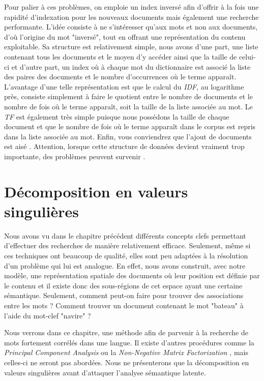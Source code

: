 Pour palier à ces problèmes, on emploie un index inversé afin d'offrir à la fois une rapidité d'indexation pour les nouveaux documents mais également une recherche performante. L'idée consiste à ne s'intéresser qu'aux mots et non aux documents, d'où l'origine du mot "inversé", tout en offrant une représentation du contenu exploitable. Sa structure est relativement simple, nous avons d'une part, une liste contenant tous les documents et le moyen d'y accéder ainsi que la taille de celui-ci et d'autre part, un index où à chaque mot du dictionnaire est associé la liste des paires des documents et le nombre d'occurrences où le terme apparaît. L'avantage d'une telle représentation est que le calcul du \textit{IDF}, au logarithme près, consiste simplement à faire le quotient entre le nombre de documents et le nombre de fois où le terme apparaît, soit la taille de la liste associée au mot. Le \textit{TF} est également très simple puisque nous possédons la taille de chaque document et que le nombre de fois où le terme apparaît dans le corpus est repris dans la liste associée au mot. Enfin, vous conviendrez que l'ajout de documents est aisé \cite{zobel2006inverted}. Attention, lorsque cette structure de données devient vraiment trop importante, des problèmes peuvent survenir \cite{brin2012reprint}.

\section{Décomposition en valeurs singulières}

Nous avons vu dans le chapitre précédent différents concepts clefs permettant d'effectuer des recherches de manière relativement efficace. Seulement, même si ces techniques ont beaucoup de qualité, elles sont peu adaptées à la résolution d'un problème qui lui est analogue. En effet, nous avons construit, avec notre modèle, une représentation spatiale des documents où leur position est définie par le contenu et il existe donc des sous-régions de cet espace ayant une certaine sémantique. Seulement, comment peut-on faire pour trouver des associations entre les mots ? Comment trouver un document contenant le mot "bateau" à l'aide du mot-clef "navire" ?

Nous verrons dans ce chapitre, une méthode afin de parvenir à la recherche de mots fortement corrélés dans une langue. Il existe d'autres procédures comme la \textit{Principal Component Analysis} \cite{pearson1901liii} ou la \textit{Non-Negative Matrix Factorization} \cite{paatero1994positive}, mais celles-ci ne seront pas abordées. Nous ne présenterons que la décomposition en valeurs singulières avant d'attaquer l'analyse sémantique latente.

